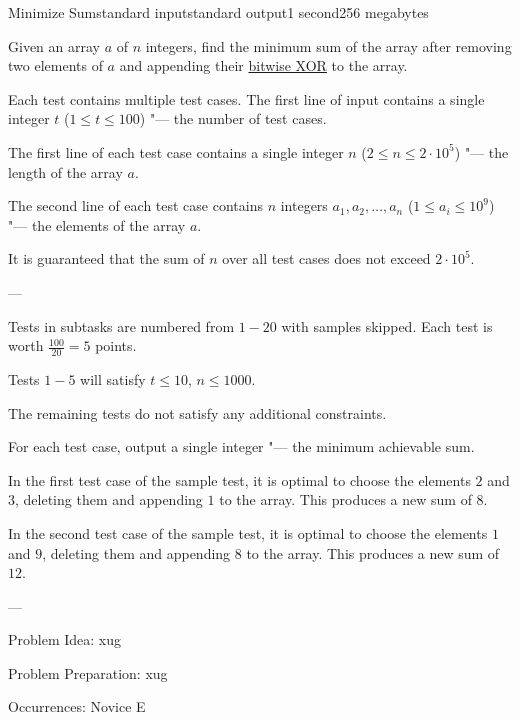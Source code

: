 \begin{problem}{Minimize Sum}{standard input}{standard output}{1 second}{256 megabytes}

Given an array $a$ of $n$ integers, find the minimum sum of the array after removing two elements of $a$ and appending their \href{https://en.wikipedia.org/wiki/Bitwise_operation#XOR}{bitwise XOR} to the array.

\InputFile
Each test contains multiple test cases. The first line of input contains a single integer $t$ ($1 \le t \le 100$) "--- the number of test cases.

The first line of each test case contains a single integer $n$ ($2 \le n \le 2 \cdot 10^5$) "--- the length of the array $a$.

The second line of each test case contains $n$ integers $a_1,a_2, \ldots ,a_n$ ($1 \le a_i \le 10^9$) "--- the elements of the array $a$.

It is guaranteed that the sum of $n$ over all test cases does not exceed $2 \cdot 10^5$.

---

Tests in subtasks are numbered from $1 - 20$ with samples skipped. Each test is worth $\frac{100}{20}=5$ points.


Tests $1 - 5$ will satisfy $t \le 10$, $n \le 1000$.

The remaining tests do not satisfy any additional constraints.

\OutputFile
For each test case, output a single integer "--- the minimum achievable sum.

\Example

\begin{example}
%
\end{example}

\Note
In the first test case of the sample test, it is optimal to choose the elements $2$ and $3$, deleting them and appending $1$ to the array. This produces a new sum of $8$.

In the second test case of the sample test, it is optimal to choose the elements $1$ and $9$, deleting them and appending $8$ to the array. This produces a new sum of $12$.

---

Problem Idea: xug

Problem Preparation: xug

Occurrences: Novice E

\end{problem}

